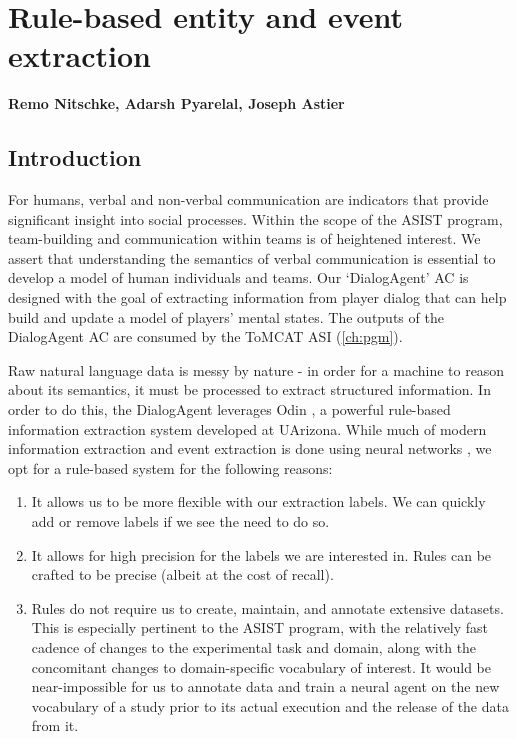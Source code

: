 \chapter{Rule-based entity and event extraction}
\label{ch:rule_based_ie}
\textbf{Remo Nitschke, Adarsh Pyarelal, Joseph Astier}

\section{Introduction}
\label{sec:ee_intro}

For humans, verbal and non-verbal communication are indicators that provide
significant insight into social processes. Within the scope of the ASIST
program, team-building and communication within teams is of heightened
interest. We assert that understanding the semantics of verbal communication is
essential to develop a model of human individuals and teams. Our `DialogAgent'
AC is designed with the goal of extracting information from player dialog that
can help build and update a model of players' mental states. The outputs of the
DialogAgent AC are consumed by the ToMCAT ASI (\autoref{ch:pgm}).

Raw natural language data is messy by nature - in order for a machine to reason
about its semantics, it must be processed to extract structured information.
In order to do this, the DialogAgent leverages Odin
\cite{valenzuela-escarcega-etal-2016-odins}, a powerful rule-based information
extraction system developed at UArizona.  While much of modern information
extraction and event extraction is done using neural networks
\cite{Ahmad2021GATEGA, Du2020EventEB}, we opt for a rule-based system for the
following reasons:

\begin{enumerate}

 \item It allows us to be more flexible with our extraction labels. We can
     quickly add or remove labels if we see the need to do so.

 \item It allows for high precision for the labels we are interested in. Rules
     can be crafted to be precise (albeit at the cost of recall).

 \item Rules do not require us to create, maintain, and annotate extensive
     datasets. This is especially pertinent to the ASIST program, with the
     relatively fast cadence of changes to the experimental task and domain,
     along with the concomitant changes to domain-specific vocabulary of
     interest.  It would be near-impossible for us to annotate data and train a
     neural agent on the new vocabulary of a study prior to its actual
     execution and the release of the data from it.

\end{enumerate}

